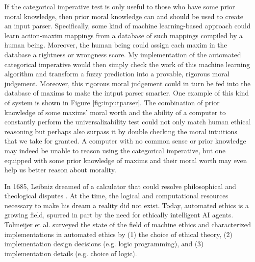 \begin{isabellebody}
\begin{isamarkuptext}
If the categorical imperative test is only useful to those who have some prior moral knowledge, then prior moral
knowledge can and should be used to create an input parser. Specifically, some kind of machine learning-based approach
could learn action-maxim mappings from a database of such mappings compiled by a human being. Moreover, 
the human being could assign each maxim in the database a rightness or wrongness score. My implementation
of the automated categorical imperative would then simply check the work of this machine learning algorithm and transform
a fuzzy prediction into a provable, rigorous moral judgement. Moreover, this rigorous moral judgement
could in turn be fed into the database of maxims to make the intput parser smarter. One example of 
this kind of system is shown in Figure \ref{fig:inputparser}. The combination of 
prior knowledge of some maxims' moral worth and the ability of a computer to constantly perform the
universalizability test could not only match human ethical reasoning but perhaps also surpass it
by double checking the moral intuitions that we take for granted. A computer with no common sense or prior knowledge
may indeed be unable to reason using the categorical imperative, but one equipped with some prior knowledge
of maxims and their moral worth may even help us better reason about morality.%
\end{isamarkuptext}\isamarkuptrue%
%
\isadelimdocument
%
\endisadelimdocument
%
\isatagdocument
%
\isamarkuptrue%
%
\endisatagdocument
{\isafolddocument}%
%
\isadelimdocument
%
\endisadelimdocument
%
\begin{isamarkuptext}%
In 1685, Leibniz dreamed of a calculator that could resolve philosophical and theological 
disputes \cite{leibniz}. At the time, the logical and computational resources necessary to make his 
dream a reality did not exist. Today, automated ethics is a growing field, spurred in part by the 
need for ethically intelligent AI agents. Tolmeijer et al. surveyed the state of the field of 
machine ethics \citep{mesurvey} and characterized implementations in automated ethics by (1) the choice 
of ethical theory, (2) implementation design decisions (e.g. logic programming), and (3) implementation 
details (e.g. choice of logic). 


\end{isamarkuptext}
\end{isabellebody}
